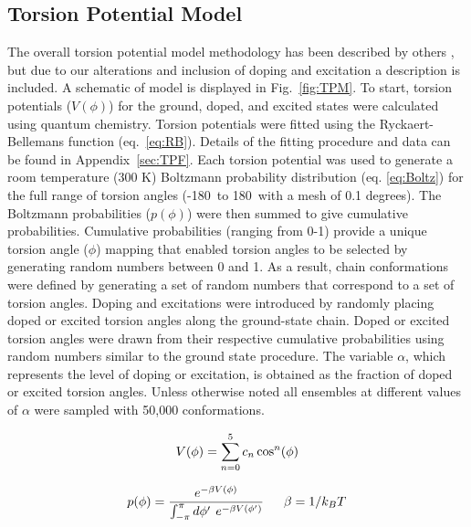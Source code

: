 \subsection{Torsion Potential Model} The overall torsion potential model methodology has been described by others \cite{Zhang2014, Claudio2001}, but due to our alterations and inclusion of doping and excitation a description is included. A schematic of model is displayed in Fig.~\ref{fig:TPM}. To start, torsion potentials ($V(\phi)$) for the ground, doped, and excited states were calculated using quantum chemistry. Torsion potentials were fitted using the Ryckaert-Bellemans function (eq.~\ref{eq:RB}). Details of the fitting procedure and data can be found in Appendix~\ref{sec:TPF}. Each torsion potential was used to generate a room temperature (300 K) Boltzmann probability distribution (eq. \ref{eq:Boltz}) for the full range of torsion angles (-180\textdegree \ to 180\textdegree \ with a mesh of 0.1 degrees). The Boltzmann probabilities ($p(\phi)$) were then summed to give cumulative probabilities. Cumulative probabilities (ranging from 0-1) provide a unique torsion angle ($\phi$) mapping that enabled torsion angles to be selected by generating random numbers between 0 and 1. As a result, chain conformations were defined by generating a set of random numbers that correspond to a set of torsion angles. Doping and excitations were introduced by randomly placing doped or excited torsion angles along the ground-state chain. Doped or excited torsion angles were drawn from their respective cumulative probabilities using random numbers similar to the ground state procedure. The variable $\alpha$, which represents the level of doping or excitation, is obtained as the fraction of doped or excited torsion angles. Unless otherwise noted all ensembles at different values of $\alpha$ were sampled with 50,000 conformations.

\begin{equation}
\label{eq:RB}
\large
V(\phi) = \sum_{n=0}^{5} c_n \cos^n(\phi)
\end{equation}

\begin{equation}
\label{eq:Boltz}
\large
p(\phi) = \frac{e^{-\beta V(\phi)}}{\int_{-\pi}^{\pi} d\phi' \ e^{-\beta V(\phi')}} \ \ \ \ \beta = 1/k_BT
\end{equation}

